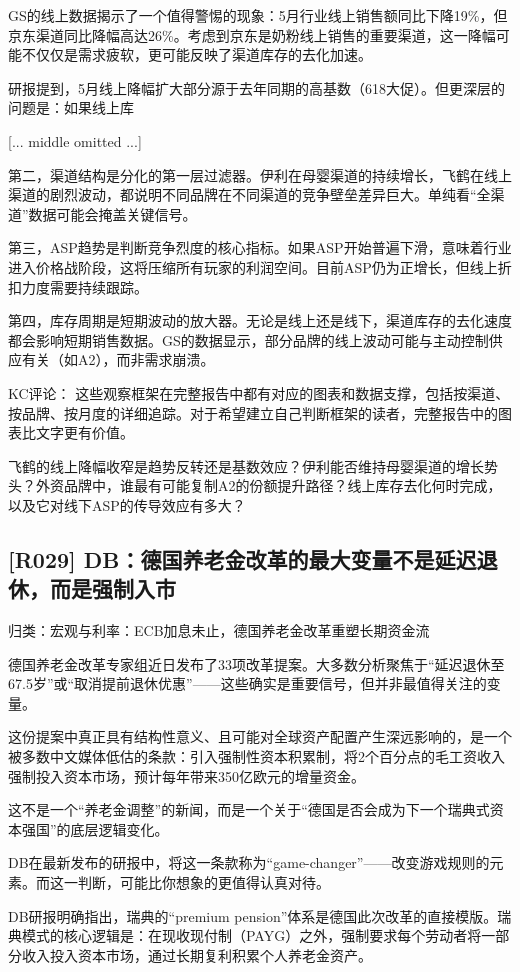 \documentclass[11pt]{ctexart}
\begin{document}
GS的线上数据揭示了一个值得警惕的现象：5月行业线上销售额同比下降19\%，但京东渠道同比降幅高达26\%。考虑到京东是奶粉线上销售的重要渠道，这一降幅可能不仅仅是需求疲软，更可能反映了渠道库存的去化加速。

研报提到，5月线上降幅扩大部分源于去年同期的高基数（618大促）。但更深层的问题是：如果线上库

[... middle omitted ...]



第二，渠道结构是分化的第一层过滤器。伊利在母婴渠道的持续增长，飞鹤在线上渠道的剧烈波动，都说明不同品牌在不同渠道的竞争壁垒差异巨大。单纯看“全渠道”数据可能会掩盖关键信号。

第三，ASP趋势是判断竞争烈度的核心指标。如果ASP开始普遍下滑，意味着行业进入价格战阶段，这将压缩所有玩家的利润空间。目前ASP仍为正增长，但线上折扣力度需要持续跟踪。

第四，库存周期是短期波动的放大器。无论是线上还是线下，渠道库存的去化速度都会影响短期销售数据。GS的数据显示，部分品牌的线上波动可能与主动控制供应有关（如A2），而非需求崩溃。

KC评论： 这些观察框架在完整报告中都有对应的图表和数据支撑，包括按渠道、按品牌、按月度的详细追踪。对于希望建立自己判断框架的读者，完整报告中的图表比文字更有价值。

飞鹤的线上降幅收窄是趋势反转还是基数效应？伊利能否维持母婴渠道的增长势头？外资品牌中，谁最有可能复制A2的份额提升路径？线上库存去化何时完成，以及它对线下ASP的传导效应有多大？

\subsection{[R029] DB：德国养老金改革的最大变量不是延迟退休，而是强制入市}
{\small\color{refgray}归类：宏观与利率：ECB加息未止，德国养老金改革重塑长期资金流}

德国养老金改革专家组近日发布了33项改革提案。大多数分析聚焦于“延迟退休至67.5岁”或“取消提前退休优惠”——这些确实是重要信号，但并非最值得关注的变量。

这份提案中真正具有结构性意义、且可能对全球资产配置产生深远影响的，是一个被多数中文媒体低估的条款：引入强制性资本积累制，将2个百分点的毛工资收入强制投入资本市场，预计每年带来350亿欧元的增量资金。

这不是一个“养老金调整”的新闻，而是一个关于“德国是否会成为下一个瑞典式资本强国”的底层逻辑变化。

DB在最新发布的研报中，将这一条款称为“game-changer”——改变游戏规则的元素。而这一判断，可能比你想象的更值得认真对待。

DB研报明确指出，瑞典的“premium pension”体系是德国此次改革的直接模版。瑞典模式的核心逻辑是：在现收现付制（PAYG）之外，强制要求每个劳动者将一部分收入投入资本市场，通过长期复利积累个人养老金资产。
\end{document}
